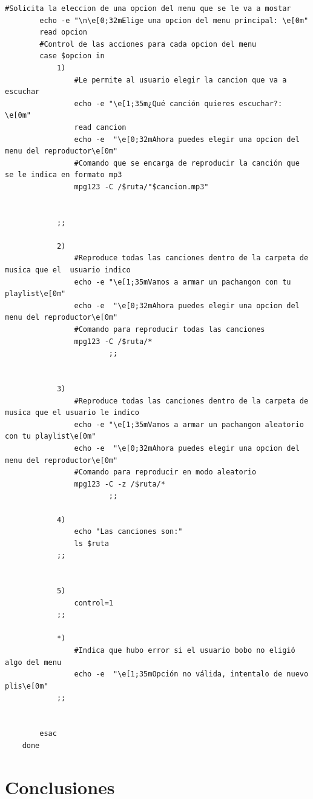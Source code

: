 \documentclass[12pt,a4paper]{article}
\begin{document}
\begin{lstlisting}[style=BashInputStyle]
		#Solicita la eleccion de una opcion del menu que se le va a mostar
		echo -e "\n\e[0;32mElige una opcion del menu principal: \e[0m"
		read opcion
		#Control de las acciones para cada opcion del menu
		case $opcion in
			1)
				#Le permite al usuario elegir la cancion que va a escuchar
				echo -e "\e[1;35m¿Qué canción quieres escuchar?: \e[0m"
				read cancion
				echo -e  "\e[0;32mAhora puedes elegir una opcion del menu del reproductor\e[0m"
				#Comando que se encarga de reproducir la canción que se le indica en formato mp3
				mpg123 -C /$ruta/"$cancion.mp3"
				

			;;

			2)
				#Reproduce todas las canciones dentro de la carpeta de musica que el  usuario indico
				echo -e "\e[1;35mVamos a armar un pachangon con tu playlist\e[0m"
				echo -e  "\e[0;32mAhora puedes elegir una opcion del menu del reproductor\e[0m"
				#Comando para reproducir todas las canciones
				mpg123 -C /$ruta/*
                        ;;


			3)
				#Reproduce todas las canciones dentro de la carpeta de musica que el usuario le indico
				echo -e "\e[1;35mVamos a armar un pachangon aleatorio con tu playlist\e[0m"
				echo -e  "\e[0;32mAhora puedes elegir una opcion del menu del reproductor\e[0m"
				#Comando para reproducir en modo aleatorio
				mpg123 -C -z /$ruta/*
                        ;;

			4)
				echo "Las canciones son:"
				ls $ruta
			;;


			5)
				control=1
			;;

			*)
				#Indica que hubo error si el usuario bobo no eligió algo del menu
				echo -e  "\e[1;35mOpción no válida, intentalo de nuevo plis\e[0m"
			;;


		esac
	done
\end{lstlisting}

\newpage
\section{Conclusiones}
\end{document}
